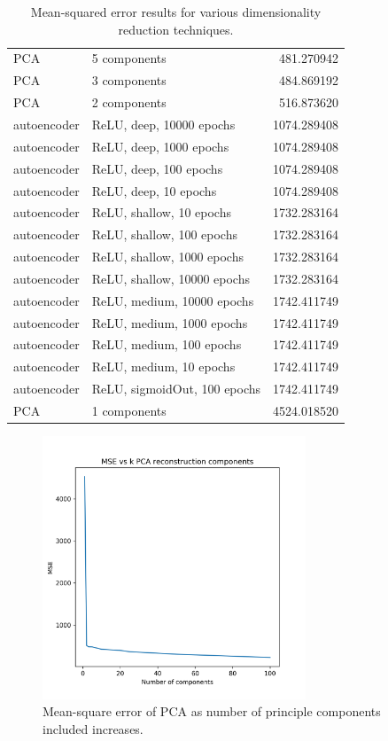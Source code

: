 \documentclass{article}
\begin{document}
\begin{table}
\begin{tabular}{llr}
        PCA &                    5 components &   481.270942 \\
        PCA &                    3 components &   484.869192 \\
        PCA &                    2 components &   516.873620 \\
autoencoder &        ReLU, deep, 10000 epochs &  1074.289408 \\
autoencoder &         ReLU, deep, 1000 epochs &  1074.289408 \\
autoencoder &          ReLU, deep, 100 epochs &  1074.289408 \\
autoencoder &           ReLU, deep, 10 epochs &  1074.289408 \\
autoencoder &        ReLU, shallow, 10 epochs &  1732.283164 \\
autoencoder &       ReLU, shallow, 100 epochs &  1732.283164 \\
autoencoder &      ReLU, shallow, 1000 epochs &  1732.283164 \\
autoencoder &     ReLU, shallow, 10000 epochs &  1732.283164 \\
autoencoder &      ReLU, medium, 10000 epochs &  1742.411749 \\
autoencoder &       ReLU, medium, 1000 epochs &  1742.411749 \\
autoencoder &        ReLU, medium, 100 epochs &  1742.411749 \\
autoencoder &         ReLU, medium, 10 epochs &  1742.411749 \\
autoencoder &    ReLU, sigmoidOut, 100 epochs &  1742.411749 \\
        PCA &                    1 components &  4524.018520 \\
\bottomrule
\end{tabular}
\caption{Mean-squared error results for various dimensionality reduction techniques.}
\label{msetable}
\end{table}

\begin{figure}
\centering
\includegraphics[width=0.7\textwidth]{../images/pca_mse_vs_k.png}
\caption{Mean-square error of PCA as number of principle components included increases.}
\label{msek}
\end{figure}
\end{document}
